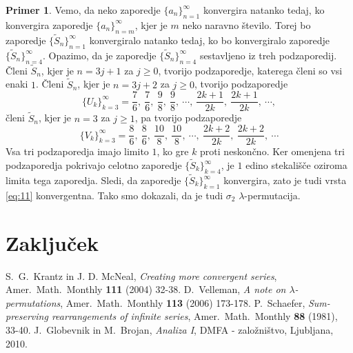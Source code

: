 \documentclass[12pt,a4paper,reqno]{amsart}
\theoremstyle{definition} %
\newtheorem{primer}[definicija]{Primer}
\theoremstyle{plain} %
\begin{document}
\begin{primer}
Vemo, da neko zaporedje $\{a_n\}_{n=1}^{\infty}$ konvergira natanko tedaj, ko konvergira zaporedje $\{a_n\}_{n=m}^{\infty}$, kjer je $m$ neko naravno število. Torej bo zaporedje $\{\tilde{S}_n\}_{n=1}^{\infty}$ konvergiralo natanko tedaj, ko bo konvergiralo zaporedje $\{\tilde{S}_n\}_{n=4}^{\infty}$. Opazimo, da je zaporedje $\{\tilde{S}_n\}_{n=4}^{\infty}$ sestavljeno iz treh podzaporedij. Členi $\tilde{S}_n$, kjer je $n=3j+1$ za $j \geq 0$, tvorijo podzaporedje, katerega členi so vsi enaki $1$. Členi $\tilde{S}_n$, kjer je $n=3j+2$ za $j \geq 0$, tvorijo podzaporedje 
$$\{U_k\}_{k=3}^{\infty}=\frac{7}{6}, \ \frac{7}{6}, \ \frac{9}{8}, \ \frac{9}{8}, \ \cdots, \ \frac{2k+1}{2k}, \ \frac{2k+1}{2k}, \ \cdots,$$
členi $\tilde{S}_n$, kjer je $n=3$ za $j \geq 1$, pa tvorijo podzaporedje 
$$\{V_k\}_{k=3}^{\infty}=\frac{8}{6}, \ \frac{8}{6}, \ \frac{10}{8}, \ \frac{10}{8}, \ \cdots, \ \frac{2k+2}{2k}, \ \frac{2k+2}{2k}, \ \cdots$$
Vsa tri podzaporedja imajo limito $1$, ko gre $k$ proti neskončno. Ker omenjena tri podzaporedja pokrivajo celotno zaporedje $\{\tilde{S}_k\}_{k=4}^{\infty}$, je $1$ edino stekališče oziroma limita tega zaporedja. Sledi, da zaporedje $\{\tilde{S}_k\}_{k=1}^{\infty}$ konvergira, zato je tudi vrsta \eqref{eq:11} konvergentna.
Tako smo dokazali, da je tudi $\sigma_2$ $\lambda$-permutacija.

\end{primer}

\section{Zaključek}



\begin{thebibliography}{99}

S.~G.~Krantz in J. D. McNeal, \textit{Creating more convergent series}, Amer.~Math.~Monthly \textbf{111} (2004) 32-38.
D.~Velleman, \textit{A note on $\lambda$-permutations}, Amer.~Math.~Monthly \textbf{113} (2006) 173-178.
P.~Schaefer, \textit{Sum-preserving rearrangements of infinite series}, Amer.~Math.~Monthly \textbf{88} (1981), 33-40.
J.~Globevnik in M.~Brojan, \textit{Analiza I},  DMFA - založništvo, Ljubljana, 2010.

\end{thebibliography}
\end{document}
